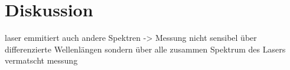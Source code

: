 


\section{Diskussion}
\label{sec:Diskussion}


laser emmitiert auch andere Spektren -> Messung nicht sensibel über differenzierte Wellenlängen sondern über alle zusammen
Spektrum des Lasers vermatscht messung



